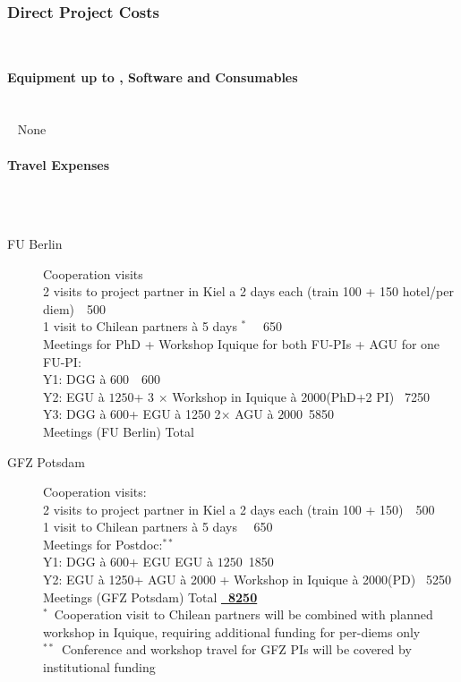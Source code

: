 \documentclass[11pt]{article}
\providecommand{\currfilename}{}
\newcommand{\myparagraph}[1]{\paragraph{#1}\mbox{}\\}
\newcommand{\showfile}{{\bf \tt \color{blue} \currfilename}}
\newcommand{\note}[1]{{\it \color{red} #1}}
\newcommand{\note}[1]{}
\newcommand{\showfile}{}
\begin{document}
\subsubsection{Direct Project Costs}
\showfile

\myparagraph{Equipment up to , Software and Consumables}
\showfile
None

\myparagraph{Travel Expenses}
\showfile
\begin{description}
 \item[FU Berlin] 
Cooperation visits\\
2 visits to project partner in Kiel a 2 days each (train 100 + 150 hotel/per diem)\hfill \texteuro\ \ 500  \\
1 visit to Chilean partners \`a 5 days $^\ast$					\hfill \texteuro\ \ 650 \\
Meetings for PhD + Workshop Iquique for both FU-PIs + AGU for one FU-PI: \\
Y1: DGG \`{a} $600$\texteuro 									\mbox{}\hfill\texteuro\ \ 600\\
Y2: EGU \`{a} $1250$\texteuro +  3 $\times$ Workshop in Iquique \`{a} 2000\texteuro (PhD+2 PI)		\mbox{}\hfill\texteuro\  7250\\
Y3: DGG \`{a} 600\texteuro + EGU \`a 1250 2$\times$ AGU \`{a} $2000$\texteuro 				\mbox{}\hfill\texteuro\ 5850\\
Meetings (FU Berlin) Total									\mbox{}\hfill \textbf{\underline{\texteuro 14850}}
 \item[GFZ Potsdam] 
Cooperation visits: \\
2 visits to project partner in Kiel a 2 days each (train 100 + 150)\hfill \texteuro\ \ 500  \\
1 visit to Chilean partners \`a 5 days 					\hfill \texteuro\ \ 650 \\
Meetings for Postdoc:$^{\ast\ast}$ \\
Y1: DGG \`{a} $600$\texteuro + EGU EGU \`{a} $1250$\texteuro 				   \mbox{}\hfill \texteuro\ 1850\\
Y2: EGU \`{a} 1250\texteuro + AGU \`{a} 2000 + Workshop in Iquique \`{a} 2000\texteuro (PD) \mbox{}\hfill\texteuro\ 5250\\
Meetings (GFZ Potsdam) Total								\mbox{}\hfill \textbf{\underline{\texteuro\ 8250}}\\
\footnotesize 
$^\ast$\ Cooperation visit to Chilean partners will be combined with planned workshop in Iquique, requiring additional funding for per-diems only\\
$^{\ast\ast}$\  Conference and workshop travel for GFZ PIs will be covered by institutional funding 
\end{description}
\end{document}
